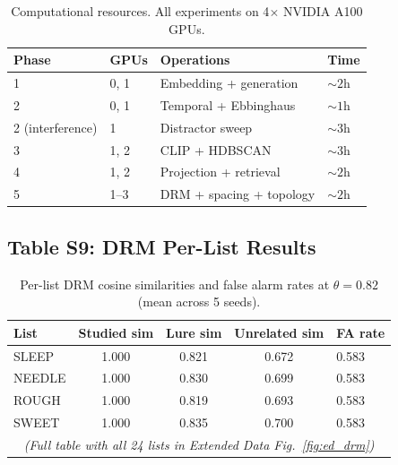 \documentclass[11pt]{article}
\begin{document}
\begin{table}[!ht]
\centering
\caption{Computational resources. All experiments on 4$\times$ NVIDIA A100 GPUs.}
\label{tab:compute}
\small
\begin{tabular}{@{}llll@{}}
\toprule
\textbf{Phase} & \textbf{GPUs} & \textbf{Operations} & \textbf{Time} \\
\midrule
1 & 0, 1 & Embedding + generation & ${\sim}2$h \\
2 & 0, 1 & Temporal + Ebbinghaus & ${\sim}1$h \\
2 (interference) & 1 & Distractor sweep & ${\sim}3$h \\
3 & 1, 2 & CLIP + HDBSCAN & ${\sim}3$h \\
4 & 1, 2 & Projection + retrieval & ${\sim}2$h \\
5 & 1--3 & DRM + spacing + topology & ${\sim}2$h \\
\bottomrule
\end{tabular}
\end{table}

\subsection*{Table S9: DRM Per-List Results}

\begin{table}[!ht]
\centering
\caption{Per-list DRM cosine similarities and false alarm rates at $\theta = 0.82$ (mean across 5 seeds).}
\label{tab:drm_perlist}
\small
\begin{tabular}{@{}lcccl@{}}
\toprule
\textbf{List} & \textbf{Studied sim} & \textbf{Lure sim} & \textbf{Unrelated sim} & \textbf{FA rate} \\
\midrule
SLEEP & 1.000 & 0.821 & 0.672 & 0.583 \\
NEEDLE & 1.000 & 0.830 & 0.699 & 0.583 \\
ROUGH & 1.000 & 0.819 & 0.693 & 0.583 \\
SWEET & 1.000 & 0.835 & 0.700 & 0.583 \\
\multicolumn{5}{c}{\textit{(Full table with all 24 lists in Extended Data Fig.~\ref{fig:ed_drm})}} \\
\bottomrule
\end{tabular}
\end{table}
\end{document}
